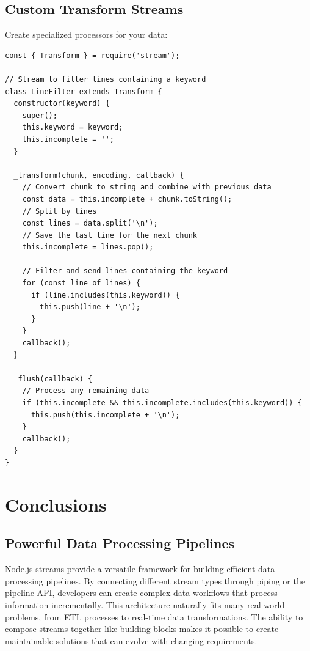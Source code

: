 \documentclass[12pt,letterpaper]{article}
\newenvironment{macterminal}{%
    \begin{mdframed}[
        linecolor=terminalFrame,
        backgroundcolor=terminalBg,
        roundcorner=5pt,
        skipabove=5pt,
        skipbelow=5pt,
        linewidth=1pt,
        innertopmargin=5pt,
        frametitle={%
            \tikz[baseline=(current bounding box.east), outer sep=0pt]{
                \fill[red!80!black] (0,0) circle (5pt);
                \fill[yellow!80!black] (0.7,0) circle (5pt);
                \fill[green!70!black] (1.4,0) circle (5pt);
            }
        },
        frametitlealignment=\raggedright,
        frametitleaboveskip=8pt,
        frametitlebelowskip=0pt,
    ]
}{%
    \end{mdframed}%
}
\begin{document}
\subsection{Custom Transform Streams}

Create specialized processors for your data:

\begin{macterminal}
\begin{lstlisting}
const { Transform } = require('stream');

// Stream to filter lines containing a keyword
class LineFilter extends Transform {
  constructor(keyword) {
    super();
    this.keyword = keyword;
    this.incomplete = '';
  }
  
  _transform(chunk, encoding, callback) {
    // Convert chunk to string and combine with previous data
    const data = this.incomplete + chunk.toString();
    // Split by lines
    const lines = data.split('\n');
    // Save the last line for the next chunk
    this.incomplete = lines.pop();
    
    // Filter and send lines containing the keyword
    for (const line of lines) {
      if (line.includes(this.keyword)) {
        this.push(line + '\n');
      }
    }
    callback();
  }
  
  _flush(callback) {
    // Process any remaining data
    if (this.incomplete && this.incomplete.includes(this.keyword)) {
      this.push(this.incomplete + '\n');
    }
    callback();
  }
}
\end{lstlisting}
\end{macterminal}

\section{Conclusions}


\subsection{Powerful Data Processing Pipelines}

Node.js streams provide a versatile framework for building efficient data processing pipelines. By connecting different stream types through piping or the pipeline API, developers can create complex data workflows that process information incrementally. This architecture naturally fits many real-world problems, from ETL processes to real-time data transformations. The ability to compose streams together like building blocks makes it possible to create maintainable solutions that can evolve with changing requirements.
\end{document}
